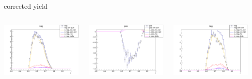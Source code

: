 \begin{frame}{corrected yield}
\begin{columns}
\begin{column}[T]{0.25\textwidth}
\includegraphics[width = \textwidth]{results/yield/statistics_corr/yield_x_Q2_z_0.45_4.750_0.60_neg.png}
\end{column}
\begin{column}[T]{0.25\textwidth}
\includegraphics[width = \textwidth]{results/yield/statistics_corr/yield_x_Q2_z_0.45_4.750_0.70_pos.png}
\end{column}
\begin{column}[T]{0.25\textwidth}
\includegraphics[width = \textwidth]{results/yield/statistics_corr/yield_x_Q2_z_0.45_4.750_0.70_neg.png}
\end{column}
\end{columns}
\end{frame}
